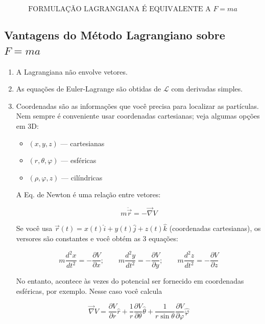 \begin{equation}
\boxed{\text{FORMULAÇÃO LAGRANGIANA É EQUIVALENTE A } F = ma}
\label{eq:aula8_equivalencia}
\end{equation}

\subsection*{Vantagens do Método Lagrangiano sobre $F=ma$}

\begin{enumerate}
\item[(i)] A Lagrangiana não envolve vetores.

\item[(ii)] As equações de Euler-Lagrange são obtidas de $\mathcal{L}$ com derivadas simples.

\item[(iii)] Coordenadas são as informações que você precisa para localizar as partículas. Nem sempre é conveniente usar coordenadas cartesianas; veja algumas opções em 3D:
\begin{itemize}
\item $(x, y, z)$ --- cartesianas
\item $(r, \theta, \varphi)$ --- esféricas
\item $(\rho, \varphi, z)$ --- cilíndricas
\end{itemize}

A Eq. de Newton é uma relação entre vetores:

\begin{equation}
m\ddot{\vec{r}} = -\vec{\nabla} V
\label{eq:aula8_newton_vetorial}
\end{equation}

Se você usa $\vec{r}(t) = x(t)\hat{i} + y(t)\hat{j} + z(t)\hat{k}$ (coordenadas cartesianas), os versores são constantes e você obtém as 3 equações:

\begin{equation}
m\frac{d^2x}{dt^2} = -\frac{\partial V}{\partial x}; \qquad
m\frac{d^2y}{dt^2} = -\frac{\partial V}{\partial y}; \qquad
m\frac{d^2z}{dt^2} = -\frac{\partial V}{\partial z}
\label{eq:aula8_newton_cartesiano}
\end{equation}

No entanto, acontece às vezes do potencial ser fornecido em coordenadas esféricas, por exemplo. Nesse caso você calcula

\begin{equation}
\vec{\nabla} V = \frac{\partial V}{\partial r}\hat{r} + \frac{1}{r}\frac{\partial V}{\partial \theta}\hat{\theta} + \frac{1}{r\sin\theta}\frac{\partial V}{\partial \varphi}\hat{\varphi}
\label{eq:aula8_gradiente_esferico}
\end{equation}


\end{enumerate}
